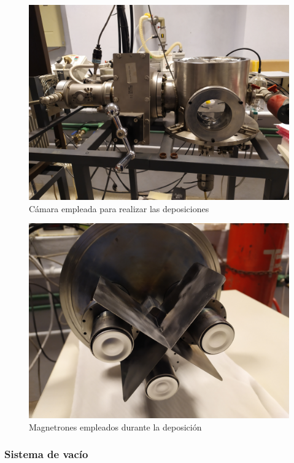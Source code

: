 \documentclass[12pt]{article}
\theoremstyle{definition}
\theoremstyle{remark}
\begin{document}
\begin{figure}[H]
	\centering
	\includegraphics[scale=0.1]{img/camara.jpg}
	\caption{Cámara empleada para realizar las deposiciones}
	\label{camara}
\end{figure}

\begin{figure}[H]
	\centering
	\includegraphics[scale=0.1]{img/magnetrones.jpg}
	\caption{Magnetrones empleados durante la deposición}
	\label{magnetrones}
\end{figure}

\subsubsection{Sistema de vacío}
\end{document}
